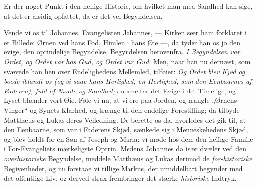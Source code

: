 \documentclass[12pt,a4paper]{book}
\begin{document}
Er der noget Punkt i den hellige Historie, om hvilket man med Sandhed kan sige,
at det er alsidig opfattet, da er det vel Begyndelsen.

Vende vi os til Johannes, Evangelisten Johannes, --- Kirken seer ham forklaret i
et Billede: Ørnen ved hans Fod, Himlen i hans Øie ---, da tyder han os jo den
evige, den oprindelige Begyndelse, Begyndelsen herovenfra. \emph{I Begyndelsen
var Ordet, og Ordet var hos Gud, og Ordet var Gud.} Men, naar han nu dernæst,
som svævede han hen over Endelighedens Mellemled, tilføier: \emph{Og Ordet blev
Kjød og boede iblandt os (og vi saae hans Herlighed, en Herlighed, som den
Eenbaarnes af Faderen), fuld af Naade og Sandhed;} da smelter det Evige i det
Timelige, og Lyset blænder vort Øie. Føle vi nu, at vi ere paa Jorden, og mangle
„Ørnens Vinger“ og Synets Klarhed, og trænge til den endelige Forestilling; da
tilbyde Matthæus og Lukas deres Veiledning. De berette os da, hvorledes det gik
til, at den Eenbaarne, som var i Faderens Skjød, sænkede sig i Menneskehedens
Skjød, og blev holdt for en Søn af Joseph og Maria: vi møde hos dem den hellige
Familie i For-Evangeliets mærkeligste Optrin. Medens Johannes da især dvæler ved
den \emph{overhistoriske} Begyndelse, meddele Matthæus og Lukas derimod de
\emph{for-historiske} Begivenheder, og nu forstaae vi tillige Markus, der
umiddelbart begynder med det offentlige Liv, og derved strax frembringer det
stærke \emph{historiske} Indtryk.
\end{document}
